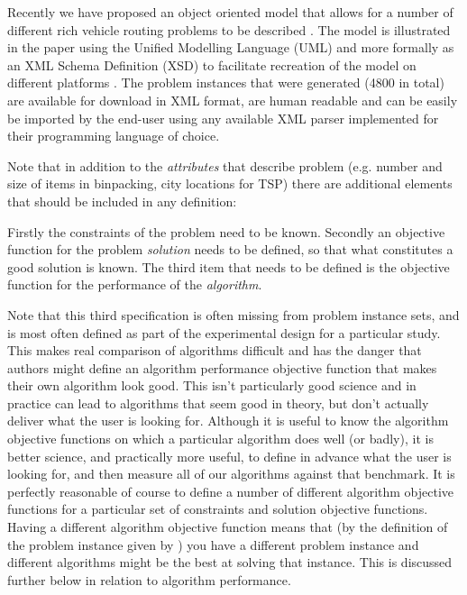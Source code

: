 \documentclass[a4paper]{article}
\begin{document}
%

Recently we have proposed an object oriented model that allows for a number of different rich vehicle routing problems to be described \cite{EuroGEN2015}.
The model is illustrated in the paper using the Unified Modelling Language (UML) and more formally as an XML Schema Definition (XSD) to facilitate recreation of the model on different platforms . 
The problem instances that were generated (4800 in total) are available for download in XML format, are human readable and can be easily be imported by the end-user using any available XML parser implemented for their programming language of choice.

Note that in addition to the {\em attributes} that describe problem (e.g. number and size of items in binpacking, city locations for TSP) there are additional elements that should be included in any definition:

Firstly the constraints of the problem need to be known.  Secondly an objective function for the problem \emph{solution} needs to be defined, so that what constitutes a good solution is known.  The third item that needs to be defined is the objective function for the performance of the  \emph{algorithm}. 


Note that this third specification is often missing from problem instance sets, and is most often defined as part of the experimental design for a particular study. This makes real comparison of algorithms difficult and has the danger that authors might define an algorithm performance objective function that makes their own algorithm look good. This isn't particularly good science and in practice can lead to algorithms that seem good in theory, but don't actually deliver what the user is looking for. Although it is useful to know the algorithm objective functions on which a particular algorithm does well  (or badly), it is better science, and practically more useful, to define in advance what the user is looking for, and then measure all of our algorithms against that benchmark. It is perfectly reasonable of course to define a number of different algorithm objective functions for a particular set of constraints and solution objective functions. Having a different algorithm objective function means that (by the definition of the problem instance given by \cite{Paechter2014}) you have a different problem instance and different algorithms might be the best at solving that instance.  This is discussed further below in relation to algorithm performance.
\end{document}
